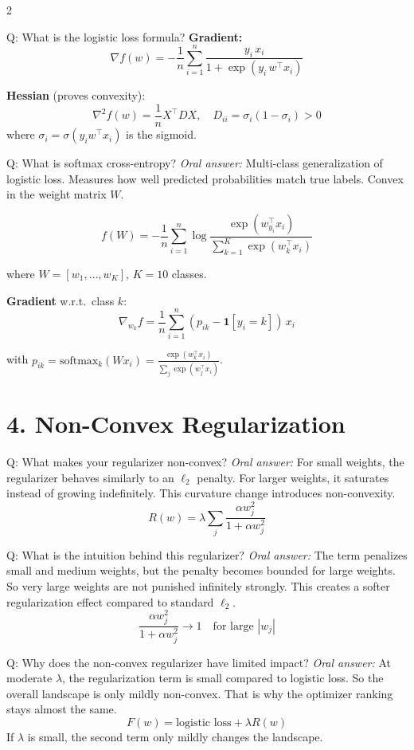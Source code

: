 \documentclass[a4paper,9pt]{article}
\newcommand{\oral}{\textit{\color{darkgray}Oral answer: }}
\begin{document}
\begin{multicols}{2}
\begin{qa}{Q: What is the logistic loss formula?}
\textbf{Gradient:}
\[
\nabla f(w) = -\frac{1}{n}\sum_{i=1}^n \frac{y_i\, x_i}{1 + \exp(y_i\, w^\top x_i)}
\]

\textbf{Hessian} (proves convexity):
\[
\nabla^2 f(w) = \frac{1}{n} X^\top D X, \quad D_{ii} = \sigma_i(1-\sigma_i) > 0
\]
where \(\sigma_i = \sigma(y_i w^\top x_i)\) is the sigmoid.
\end{qa}

\begin{qa}{Q: What is softmax cross-entropy?}
\oral Multi-class generalization of logistic loss.
Measures how well predicted probabilities match true labels.
Convex in the weight matrix \(W\).

\[
f(W) = -\frac{1}{n}\sum_{i=1}^n \log \frac{\exp(w_{y_i}^\top x_i)}{\sum_{k=1}^K \exp(w_k^\top x_i)}
\]

where \(W = [w_1, \ldots, w_K]\), \(K=10\) classes.

\textbf{Gradient} w.r.t.\ class \(k\):
\[
\nabla_{w_k} f = \frac{1}{n}\sum_{i=1}^n (p_{ik} - \mathbf{1}[y_i=k])\, x_i
\]

with \(p_{ik} = \text{softmax}_k(Wx_i) = \frac{\exp(w_k^\top x_i)}{\sum_j \exp(w_j^\top x_i)}\).
\end{qa}

\section{4. Non-Convex Regularization}

\begin{qa}{Q: What makes your regularizer non-convex?}
\oral For small weights, the regularizer behaves similarly to an \(\ell_2\) penalty. 
For larger weights, it saturates instead of growing indefinitely. 
This curvature change introduces non-convexity.
\[
R(w)
=
\lambda
\sum_j
\frac{\alpha w_j^2}
{1+\alpha w_j^2}
\]
\end{qa}

\begin{qa}{Q: What is the intuition behind this regularizer?}
\oral The term penalizes small and medium weights, but the penalty becomes bounded for large weights. 
So very large weights are not punished infinitely strongly. 
This creates a softer regularization effect compared to standard \(\ell_2\).
\[
\frac{\alpha w_j^2}{1+\alpha w_j^2}
\rightarrow 1
\quad \text{for large } |w_j|
\]
\end{qa}

\begin{qa}{Q: Why does the non-convex regularizer have limited impact?}
\oral At moderate \(\lambda\), the regularization term is small compared to logistic loss. 
So the overall landscape is only mildly non-convex. 
That is why the optimizer ranking stays almost the same.
\[
F(w)= \text{logistic loss} + \lambda R(w)
\]
If \(\lambda\) is small, the second term only mildly changes the landscape.
\end{qa}


\end{multicols}
\end{document}
